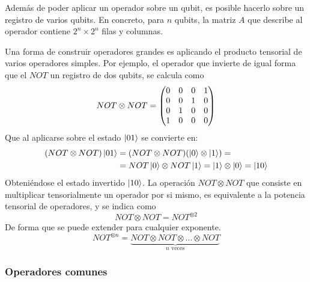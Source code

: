 Además de poder aplicar un operador sobre un qubit, es posible hacerlo sobre un 
registro de varios qubits. En concreto, para $n$ qubits, la matriz $A$ que 
describe al operador contiene $2^n \times 2^n$ filas y columnas.

Una forma de construir operadores grandes es aplicando el producto tensorial de 
varios operadores simples. Por ejemplo, el operador que invierte de igual forma 
que el $NOT$ un registro de dos qubits, se calcula como
%
$$ NOT \otimes NOT = \begin{pmatrix} 0&0&0&1\\ 0&0&1&0 \\ 0&1&0&0 \\ 1&0&0&0 \end{pmatrix}$$
%
Que al aplicarse sobre el estado $\ket{01}$ se convierte en:
%
\begin{equation*}
\begin{split}
(NOT \otimes NOT) \ket{01} &= (NOT \otimes NOT) (\ket{0} \otimes \ket{1}) =\\
& = NOT \ket{0} \otimes NOT \ket{1} = \ket{1} \otimes \ket{0} = \ket{10}
\end{split}
\end{equation*}
%
Obteniéndose el estado invertido $\ket{10}$. La operación $NOT \otimes NOT$ que 
consiste en multiplicar tensorialmente un operador por si mismo, es equivalente 
a la potencia tensorial de operadores, y se indica como
%
$$ NOT \otimes NOT = NOT^{\otimes 2} $$
%
De forma que se puede extender para cualquier exponente.
%
$$ NOT^{\otimes n} = \underbrace{NOT\otimes NOT\otimes \ldots \otimes NOT}_{n 
\text{ veces}}$$
%

\subsubsection{Operadores comunes}


